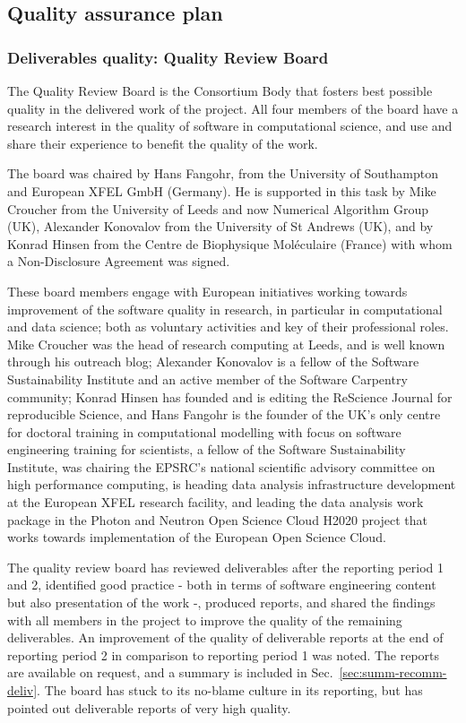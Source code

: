 \subsection{Quality assurance plan}
\label{section.QAP}

\subsubsection{Deliverables quality: Quality Review Board}

The Quality Review Board is the Consortium Body that fosters best
possible quality in the delivered work of the project.
All four members of the board
have a research interest in the quality of software in computational
science, and use and share their experience to benefit the quality of
the work.

The board was chaired by Hans Fangohr, from the University of
Southampton and European XFEL GmbH (Germany). He is supported in this task by
Mike Croucher from the University of Leeds and now
Numerical Algorithm Group (UK), Alexander Konovalov from
the University of St Andrews (UK), and by Konrad Hinsen from the Centre de
Biophysique Moléculaire (France) with whom a Non-Disclosure Agreement was
signed.

These board members engage with European initiatives working towards
improvement of the software quality in research, in particular in
computational and data science; both as voluntary activities and key
of their professional roles. Mike Croucher was the head of research
computing at Leeds, and is well known through his outreach blog; Alexander Konovalov
is a fellow of the Software Sustainability Institute and an active
member of the Software Carpentry community; Konrad Hinsen has
founded and is editing the ReScience Journal for reproducible Science,
and Hans Fangohr is the founder of the UK's only centre for
doctoral training in computational modelling with focus on software
engineering training for scientists, a fellow of the Software
Sustainability Institute, was chairing the EPSRC's national scientific
advisory committee on high performance computing, is heading
data analysis infrastructure development at the European XFEL research
facility, and leading the data analysis work package in the Photon and
Neutron Open Science Cloud H2020 project that works towards
implementation of the European Open Science Cloud.

The quality review board has reviewed deliverables after the reporting
period 1 and 2, identified good practice - both in terms of software
engineering content but also presentation of the work -, produced
reports, and shared the findings with all members in the project to
improve the quality of the remaining deliverables. An improvement of
the quality of deliverable reports at the end of reporting period 2 in
comparison to reporting period 1 was noted. The reports are available
on request, and a summary is included in
Sec.~\ref{sec:summ-recomm-deliv}. The board has stuck to its no-blame
culture in its reporting, but has pointed out deliverable reports of
very high quality.


